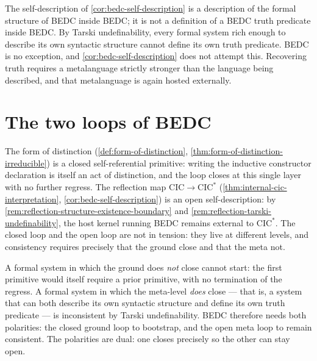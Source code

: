 \begin{remark}
\label{rem:reflection-tarski-undefinability}
The self-description of \autoref{cor:bedc-self-description} is a description of the formal structure of BEDC inside BEDC; it is not a definition of a BEDC truth predicate inside BEDC. By Tarski undefinability, every formal system rich enough to describe its own syntactic structure cannot define its own truth predicate. BEDC is no exception, and \autoref{cor:bedc-self-description} does not attempt this. Recovering truth requires a metalanguage strictly stronger than the language being described, and that metalanguage is again hosted externally.
\end{remark}

\section{The two loops of BEDC}
\label{sec:reflection-two-loops}

\begin{theorem}
\label{thm:two-loops}
The form of distinction (\autoref{def:form-of-distinction}, \autoref{thm:form-of-distinction-irreducible}) is a closed self-referential primitive: writing the inductive constructor declaration is itself an act of distinction, and the loop closes at this single layer with no further regress. The reflection map $\mathrm{CIC} \to \mathrm{CIC}^{*}$ (\autoref{thm:internal-cic-interpretation}, \autoref{cor:bedc-self-description}) is an open self-description: by \autoref{rem:reflection-structure-existence-boundary} and \autoref{rem:reflection-tarski-undefinability}, the host kernel running BEDC remains external to $\mathrm{CIC}^{*}$. The closed loop and the open loop are not in tension: they live at different levels, and consistency requires precisely that the ground close and that the meta not.
\end{theorem}

\begin{remark}
\label{rem:two-loops-polarities}
A formal system in which the ground does \emph{not} close cannot start: the first primitive would itself require a prior primitive, with no termination of the regress. A formal system in which the meta-level \emph{does} close --- that is, a system that can both describe its own syntactic structure and define its own truth predicate --- is inconsistent by Tarski undefinability. BEDC therefore needs both polarities: the closed ground loop to bootstrap, and the open meta loop to remain consistent. The polarities are dual: one closes precisely so the other can stay open.
\end{remark}

